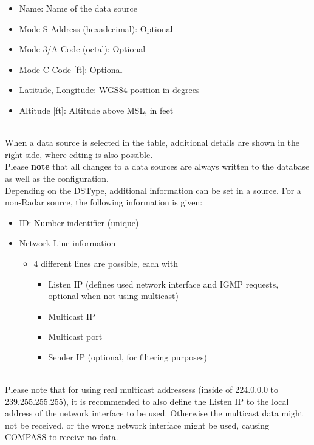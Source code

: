 \begin{itemize}
\item Name: Name of the data source
\item Mode S Address (hexadecimal): Optional
\item Mode 3/A Code (octal): Optional
\item Mode C Code [ft]: Optional
\item Latitude, Longitude: WGS84 position in degrees
\item Altitude [ft]: Altitude above MSL, in feet
\end{itemize}
\ \\

When a data source is selected in the table, additional details are shown in the right side, where edting is also possible. \\

Please \textbf{note} that all changes to a data sources are always written to the database as well as the configuration. \\

Depending on the DSType, additional information can be set in a source. For a non-Radar source, the following information is given:

\begin{itemize}
\item ID: Number indentifier (unique)
\item Network Line information
\begin{itemize}
    \item 4 different lines are possible, each with 
    \begin{itemize}
      \item Listen IP (defines used network interface and IGMP requests, optional when not using multicast)
      \item Multicast IP
      \item Multicast port
      \item Sender IP (optional, for filtering purposes)
    \end{itemize}
\end{itemize}
\end{itemize}
\ \\

Please note that for using real multicast addressess (inside of 224.0.0.0 to 239.255.255.255), it is recommended to also define the Listen IP to the local address of the network interface to be used. Otherwise the multicast data might not be received, or the wrong network interface might be used, causing COMPASS to receive no data. \\

